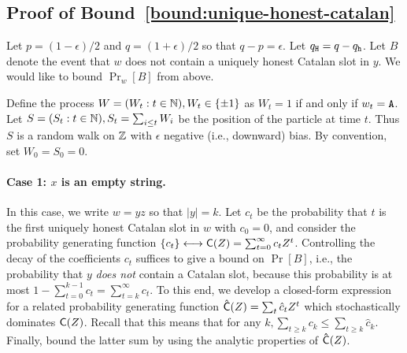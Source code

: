 \subsection{Proof of Bound~\ref{bound:unique-honest-catalan}}\label{sec:catalan-estimates}
  Let $p = (1 - \epsilon)/2$ and $q = (1 + \epsilon)/2$ 
  so that $q - p = \epsilon$. 
  Let $q_{\mathtt{H}} = q - q_{\mathtt{h}}$. 
  Let $B$ denote the event that 
  $w$ does not contain a uniquely honest Catalan slot in $y$. 
  We would like to bound $\Pr_w[B]$ from above.


  Define the process $W = (W_t : t \in \mathbb{N}), W_t \in \{\pm 1\}$ as $W_t = 1$ if and only if $w_t = \mathtt{A}$. 
  Let $S = (S_t : t \in \mathbb{N}), S_t = \sum_{i \leq t} W_i$ be the position of the particle at time $t$. 
  Thus $S$ is a random walk on $\mathbb{Z}$ with $\epsilon$ negative (i.e., downward) bias. 
  By convention, set $W_0 = S_0 = 0$. 

  \paragraph{Case 1: $x$ is an empty string.} 
  In this case, we write $w = yz$ so that $|y| = k$. 
  Let $c_t$ be the probability that $t$ is the first uniquely honest Catalan slot in $w$ 
  with $c_0 = 0$, and consider the probability generating function 
  $\{c_t\} \longleftrightarrow \mathsf{C}(Z) = \sum_{t = 0}^\infty c_t Z^t$. 
  Controlling the decay of the coefficients $c_t$ suffices
  to give a bound on $\Pr[B]$, i.e., 
  the probability that 
  $y$ \emph{does not} contain a Catalan slot, 
  because this probability is at most 
  $
    1 - \sum_{t =0}^{k-1} c_t 
      = \sum_{t = k}^\infty c_t
  $. 
  To this end, we develop a
  closed-form expression for a related probability generating function
  $\mathsf{\hat{C}}(Z) = \sum_t \hat{c}_t Z^t$ which stochastically
  dominates $\mathsf{C}(Z)$. 
  Recall that this means that for any $k, \sum_{t \geq k} c_k \leq \sum_{t \geq k} \hat{c}_k$. 
  Finally, bound the latter sum  
  by using the analytic properties of $\mathsf{\hat{C}}(Z)$. 

